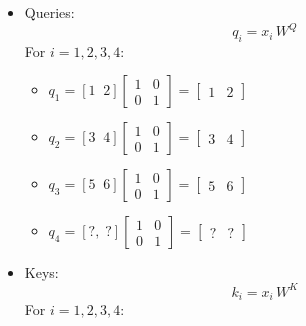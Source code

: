 \begin{itemize}
	\item Queries:  
   \[
     q_i = x_i \, W^Q 
   \]
   For \(i=1,2,3,4\):
   \begin{itemize}
	   \item \(q_1 = [1\;\;2] \begin{bmatrix}1 & 0 \\ 0 & 1\end{bmatrix} = \begin{bmatrix}1 & 2\end{bmatrix}\)
	   \item \(q_2 = [3\;\;4] \begin{bmatrix}1 & 0 \\ 0 & 1\end{bmatrix} = \begin{bmatrix}3 & 4\end{bmatrix}\)
	   \item \(q_3 = [5\;\;6] \begin{bmatrix}1 & 0 \\ 0 & 1\end{bmatrix} = \begin{bmatrix}5 & 6\end{bmatrix}\)
	   \item \(q_4 = [?,\; ?] \begin{bmatrix}1 & 0 \\ 0 & 1\end{bmatrix} = \begin{bmatrix}? & ?\end{bmatrix}\)
   \end{itemize}
	\item Keys:
	   \[
		 k_i = x_i \, W^K
	   \]
	   For \(i=1,2,3,4\):
\end{itemize}
